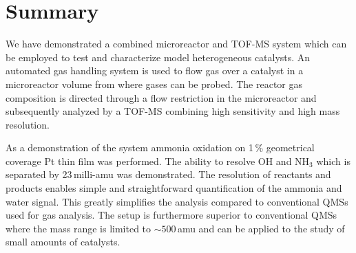 \documentclass[aip,rsi]{revtex4-1}
\begin{document}

\section{Summary}
We have demonstrated a combined microreactor and TOF-MS system which can be employed to test and characterize model heterogeneous catalysts. An automated gas handling system is used to flow gas over a catalyst in a microreactor volume from where gases can be probed. The reactor gas composition is directed through a flow restriction in the microreactor and subsequently analyzed by a TOF-MS combining high sensitivity and high mass resolution.

As a demonstration of the system ammonia oxidation on 1\,\% geometrical coverage Pt thin film was performed. The ability to resolve OH and NH$_3$ which is separated by 23\,milli-amu was demonstrated. The resolution of reactants and products enables simple and straightforward quantification of the ammonia and water signal. This greatly simplifies the analysis compared to conventional QMSs used for gas analysis. The setup is furthermore superior to conventional QMSs where the mass range is limited to $\sim500$\,amu and can be applied to the study of small amounts of catalysts.



%
%
\end{document}
